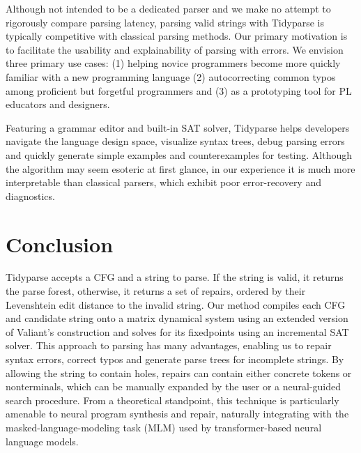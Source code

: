 \documentclass[sigplan,nonacm]{acmart}\settopmatter{printfolios=false,printccs=false,printacmref=false}
\begin{document}
Although not intended to be a dedicated parser and we make no attempt to rigorously compare parsing latency, parsing valid strings with Tidyparse is typically competitive with classical parsing methods. Our primary motivation is to facilitate the usability and explainability of parsing with errors. We envision three primary use cases: (1) helping novice programmers become more quickly familiar with a new programming language (2) autocorrecting common typos among proficient but forgetful programmers and (3) as a prototyping tool for PL educators and designers.

Featuring a grammar editor and built-in SAT solver, Tidyparse helps developers navigate the language design space, visualize syntax trees, debug parsing errors and quickly generate simple examples and counterexamples for testing. Although the algorithm may seem esoteric at first glance, in our experience it is much more interpretable than classical parsers, which exhibit poor error-recovery and diagnostics.

\section{Conclusion}

Tidyparse accepts a CFG and a string to parse. If the string is valid, it returns the parse forest, otherwise, it returns a set of repairs, ordered by their Levenshtein edit distance to the invalid string. Our method compiles each CFG and candidate string onto a matrix dynamical system using an extended version of Valiant's construction and solves for its fixedpoints using an incremental SAT solver. This approach to parsing has many advantages, enabling us to repair syntax errors, correct typos and generate parse trees for incomplete strings. By allowing the string to contain holes, repairs can contain either concrete tokens or nonterminals, which can be manually expanded by the user or a neural-guided search procedure. From a theoretical standpoint, this technique is particularly amenable to neural program synthesis and repair, naturally integrating with the masked-language-modeling task (MLM) used by transformer-based neural language models.
\end{document}
